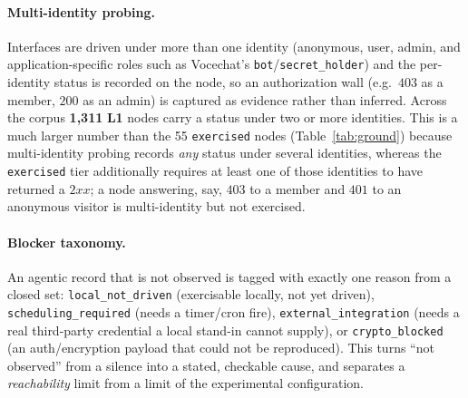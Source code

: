\documentclass[11pt,a4paper]{article}
\newcommand{\cd}[1]{\lstinline[basicstyle=\ttfamily\small]|#1|}
\renewcommand{\L}[1]{\textbf{L#1}}
\begin{document}
\paragraph{Multi-identity probing.} Interfaces are driven under more than one identity
(anonymous, user, admin, and application-specific roles such as Vocechat's
\cd{bot}/\cd{secret_holder}) and the per-identity status is recorded on the node, so an
authorization wall (e.g.\ $403$ as a member, $200$ as an admin) is captured as evidence
rather than inferred. Across the corpus \textbf{1{,}311} \L1 nodes carry a status under two
or more identities. This is a much larger number than the 55 \cd{exercised} nodes
(Table~\ref{tab:ground}) because multi-identity probing records \emph{any} status under
several identities, whereas the \cd{exercised} tier additionally requires at least one of
those identities to have returned a $2xx$; a node answering, say, $403$ to a member and
$401$ to an anonymous visitor is multi-identity but not exercised.

\paragraph{Blocker taxonomy.} An agentic record that is not observed is tagged with
exactly one reason from a closed set: \cd{local_not_driven} (exercisable locally, not yet
driven), \cd{scheduling_required} (needs a timer/cron fire), \cd{external_integration}
(needs a real third-party credential a local stand-in cannot supply), or
\cd{crypto_blocked} (an auth/encryption payload that could not be reproduced). This turns
``not observed'' from a silence into a stated, checkable cause, and separates a
\emph{reachability} limit from a limit of the experimental configuration.
\end{document}
